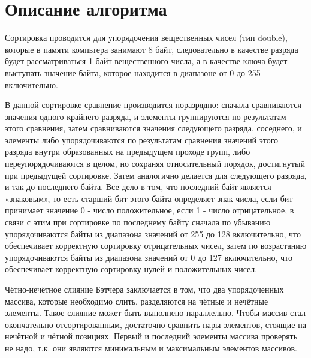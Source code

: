 \documentclass{report}
\begin{document}
\section*{Описание алгоритма}
Сортировка проводится для упорядочения вещественных чисел (тип double), которые в памяти компьтера занимают 8 байт, следовательно в качестве разряда будет рассматриваться 1 байт вещественного числа, а в качестве ключа будет выступать значение байта, которое находится в диапазоне от 0 до 255 включительно.
\par В данной сортировке сравнение производится поразрядно: сначала сравниваются значения одного крайнего разряда, и элементы группируются по результатам этого сравнения, затем сравниваются значения следующего разряда, соседнего, и элементы либо упорядочиваются по результатам сравнения значений этого разряда внутри образованных на предыдущем проходе групп, либо переупорядочиваются в целом, но сохраняя относительный порядок, достигнутый при предыдущей сортировке. Затем аналогично делается для следующего разряда, и так до последнего байта. Все дело в том, что последний байт является «знаковым», то есть старший бит этого байта определяет знак числа, если бит принимает значение 0 - число положительное, если 1 - число отрицательное, в связи с этим при сортировке по последнему байту сначала по убыванию упорядочиваются байты из диапазона значений от 255 до 128 включительно, что обеспечивает корректную сортировку отрицательных чисел, затем по возрастанию упорядочиваются байты из диапазона значений от 0 до 127 включительно, что обеспечивает корректную сортировку нулей и положительных чисел.
\par Чётно-нечётное слияние Бэтчера заключается в том, что два упорядоченных массива, которые необходимо слить, разделяются на чётные и нечётные элементы.  Такое слияние может быть выполнено параллельно. Чтобы массив стал окончательно отсортированным, достаточно сравнить
пары элементов, стоящие на нечётной и чётной позициях. Первый и последний элементы массива проверять не надо, т.к. они являются минимальным и максимальным элементов массивов. 
\newpage

\end{document}
